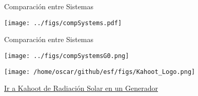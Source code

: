 \documentclass[xcolor={usenames,svgnames,dvipsnames}]{beamer}
\begin{document}
\begin{frame}[label={sec:org74ca069}]{Comparación entre Sistemas}
\begin{center}
\texttt{[image: ../figs/compSystems.pdf]}
\end{center}
\end{frame}

\begin{frame}[label={sec:org2ae0c2f}]{Comparación entre Sistemas}
\begin{center}
\texttt{[image: ../figs/compSystemsG0.png]}
\end{center}
\end{frame}


\begin{frame}[label={sec:orgbc54dfa}]{}
\begin{center}
\texttt{[image: /home/oscar/github/esf/figs/Kahoot\_Logo.png]}
\end{center}

\href{https://play.kahoot.it/v2/?quizId=29a16906-539a-4e29-b68c-fe6c9141ef02}{Ir a Kahoot de Radiación Solar en un Generador}
\end{frame}
\end{document}
